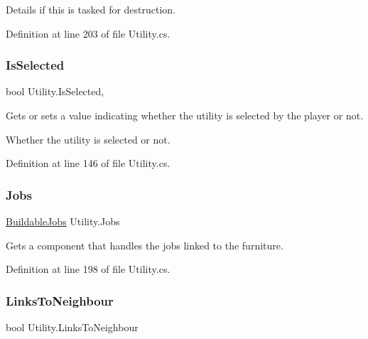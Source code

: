 Details if this is tasked for destruction. 



Definition at line 203 of file Utility.\+cs.

\mbox{\label{class_utility_a51c3ffb57defa6be90a9d12cbf43902c}} 
\subsubsection{\texorpdfstring{Is\+Selected}{IsSelected}}
{\footnotesize\ttfamily bool Utility.\+Is\+Selected\hspace{0.3cm}{\ttfamily [get]}, {\ttfamily [set]}}



Gets or sets a value indicating whether the utility is selected by the player or not. 

Whether the utility is selected or not.

Definition at line 146 of file Utility.\+cs.

\mbox{\label{class_utility_afe0e0b52870147d9e0a84349972145c8}} 
\subsubsection{\texorpdfstring{Jobs}{Jobs}}
{\footnotesize\ttfamily \hyperlink{class_buildable_jobs}{Buildable\+Jobs} Utility.\+Jobs\hspace{0.3cm}{\ttfamily [get]}}



Gets a component that handles the jobs linked to the furniture. 



Definition at line 198 of file Utility.\+cs.

\mbox{\label{class_utility_a296d48306922e1bf7a859171849ea7da}} 
\subsubsection{\texorpdfstring{Links\+To\+Neighbour}{LinksToNeighbour}}
{\footnotesize\ttfamily bool Utility.\+Links\+To\+Neighbour\hspace{0.3cm}{\ttfamily [get]}}



